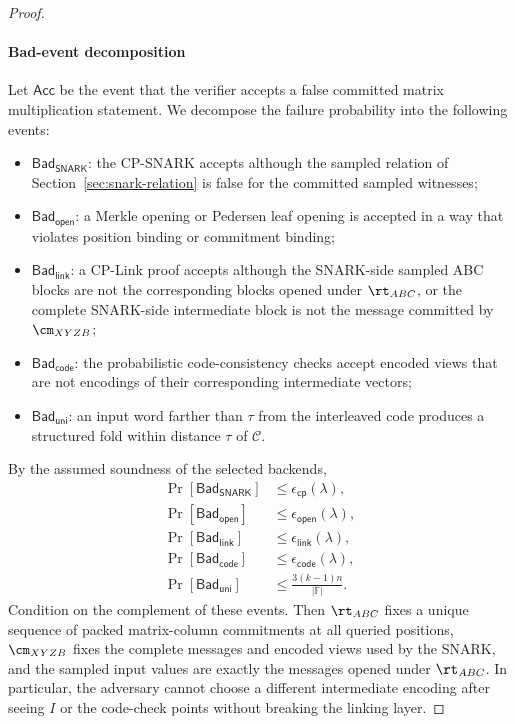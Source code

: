\begin{proof}
\paragraph{Bad-event decomposition}
Let \(\mathsf{Acc}\) be the event that the verifier accepts a false committed
matrix multiplication statement.  We decompose the failure probability into
the following events:
\begin{itemize}
  \item \(\mathsf{Bad}_{\mathsf{SNARK}}\): the CP-SNARK accepts although the
  sampled relation of Section~\ref{sec:snark-relation} is false for the
  committed sampled witnesses;
  \item \(\mathsf{Bad}_{\mathsf{open}}\): a Merkle opening or Pedersen leaf
  opening is accepted in a way that violates position binding or commitment
  binding;
  \item \(\mathsf{Bad}_{\mathsf{link}}\): a CP-Link proof accepts although the
  SNARK-side sampled ABC blocks are not the corresponding blocks opened under
  \(\rt_{ABC}\), or the complete SNARK-side intermediate block is not the
  message committed by \(\cm_{XYZB}\);
  \item \(\mathsf{Bad}_{\mathsf{code}}\): the probabilistic code-consistency
  checks accept encoded views that are not encodings of their corresponding
  intermediate vectors;
  \item \(\mathsf{Bad}_{\mathsf{uni}}\): an input word farther than
  \(\tau\) from the interleaved code produces a structured fold within
  distance \(\tau\) of \(\mathcal{C}\).
\end{itemize}
By the assumed soundness of the selected backends,
\[
\begin{aligned}
\Pr[\mathsf{Bad}_{\mathsf{SNARK}}]
  &\le \epsilon_{\mathsf{cp}}(\lambda),\\
\Pr[\mathsf{Bad}_{\mathsf{open}}]
  &\le \epsilon_{\mathsf{open}}(\lambda),\\
\Pr[\mathsf{Bad}_{\mathsf{link}}]
  &\le \epsilon_{\mathsf{link}}(\lambda),\\
\Pr[\mathsf{Bad}_{\mathsf{code}}]
  &\le \epsilon_{\mathsf{code}}(\lambda),\\
\Pr[\mathsf{Bad}_{\mathsf{uni}}]
  &\le \frac{3(k-1)n}{|\mathbb F|}.
\end{aligned}
\]
Condition on the complement of these events.  Then \(\rt_{ABC}\) fixes a
unique sequence of packed matrix-column commitments at all queried positions,
\(\cm_{XYZB}\) fixes the complete messages and encoded views used by the
SNARK, and the sampled input values are exactly the messages opened under
\(\rt_{ABC}\).  In particular, the adversary cannot choose a different
intermediate encoding after seeing \(I\) or the code-check points without
breaking the linking layer.


\end{proof}
